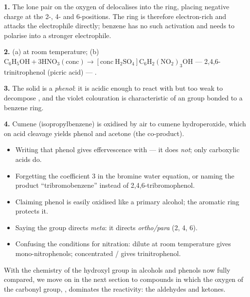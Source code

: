 \documentclass[11pt]{article}
\begin{document}
\begin{corrige}[Exercise 1]
\textbf{1.} The lone pair on the oxygen of  delocalises into the ring, placing negative charge at the 2-, 4- and 6-positions. The ring is therefore electron-rich and attacks the electrophile  directly; benzene has no such activation and needs  to polarise  into a stronger electrophile.

\textbf{2.} (a)  at room temperature; (b) \ensuremath{\mathrm{C_{6}H_{5}OH + 3HNO_{3}(conc) \rightarrow [conc\ H_{2}SO_{4}] C_{6}H_{2}(NO_{2})_{3}OH}} — 2,4,6-trinitrophenol (picric acid) — .

\textbf{3.} The solid is a \emph{phenol}: it is acidic enough to react with  but too weak to decompose , and the violet  colouration is characteristic of an  group bonded to a benzene ring.

\textbf{4.} Cumene (isopropylbenzene) is oxidised by air to cumene hydroperoxide, which on acid cleavage yields phenol and acetone (the co-product).
\end{corrige}

\begin{attention}
\begin{itemize}
\item Writing that phenol gives effervescence with  — it does \emph{not}; only carboxylic acids do.
\item Forgetting the coefficient 3 in the bromine water equation, or naming the product ``tribromobenzene'' instead of 2,4,6-tribromophenol.
\item Claiming phenol is easily oxidised like a primary alcohol; the aromatic ring protects it.
\item Saying the  group directs \emph{meta}: it directs \emph{ortho/para} (2, 4, 6).
\item Confusing the conditions for nitration: dilute  at room temperature gives mono-nitrophenols; concentrated / gives trinitrophenol.
\end{itemize}
\end{attention}

With the chemistry of the hydroxyl group in alcohols and phenols now fully compared, we move on in the next section to compounds in which the oxygen of the carbonyl group, , dominates the reactivity: the aldehydes and ketones.
\end{document}
